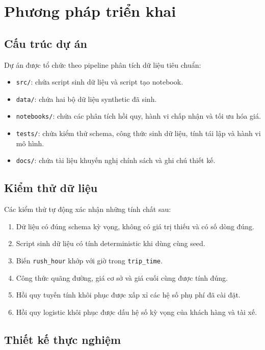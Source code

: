 \documentclass[12pt,a4paper]{report}
\begin{document}
\chapter{Phương pháp triển khai}

\section{Cấu trúc dự án}

Dự án được tổ chức theo pipeline phân tích dữ liệu tiêu chuẩn:

\begin{itemize}
    \item \texttt{src/}: chứa script sinh dữ liệu và script tạo notebook.
    \item \texttt{data/}: chứa hai bộ dữ liệu synthetic đã sinh.
    \item \texttt{notebooks/}: chứa các phân tích hồi quy, hành vi chấp nhận và tối ưu hóa giá.
    \item \texttt{tests/}: chứa kiểm thử schema, công thức sinh dữ liệu, tính tái lập và hành vi mô hình.
    \item \texttt{docs/}: chứa tài liệu khuyến nghị chính sách và ghi chú thiết kế.
\end{itemize}

\section{Kiểm thử dữ liệu}

Các kiểm thử tự động xác nhận những tính chất sau:

\begin{enumerate}
    \item Dữ liệu có đúng schema kỳ vọng, không có giá trị thiếu và có số dòng đúng.
    \item Script sinh dữ liệu có tính deterministic khi dùng cùng seed.
    \item Biến \texttt{rush\_hour} khớp với giờ trong \texttt{trip\_time}.
    \item Công thức quãng đường, giá cơ sở và giá cuối cùng được tính đúng.
    \item Hồi quy tuyến tính khôi phục được xấp xỉ các hệ số phụ phí đã cài đặt.
    \item Hồi quy logistic khôi phục được dấu hệ số kỳ vọng của khách hàng và tài xế.
\end{enumerate}

\section{Thiết kế thực nghiệm}
\end{document}
